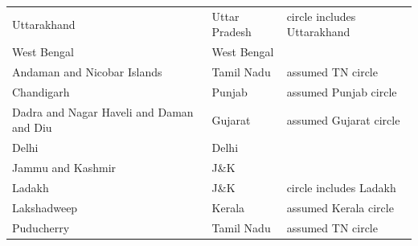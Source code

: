 \documentclass[runningheads]{llncs}
\begin{document}
\begin{longtable}{@{}P{.29\textwidth}P{.25\textwidth}P{.38\textwidth}@{}}
Uttarakhand & Uttar Pradesh & circle includes Uttarakhand \\
West Bengal & West Bengal &  \\
Andaman and Nicobar Islands & Tamil Nadu & assumed TN circle \\
Chandigarh & Punjab & assumed Punjab circle \\
Dadra and Nagar Haveli and Daman and Diu & Gujarat & assumed Gujarat circle \\
Delhi & Delhi &  \\
Jammu and Kashmir & J\&K &  \\
Ladakh & J\&K & circle includes Ladakh \\
Lakshadweep & Kerala & assumed Kerala circle \\
Puducherry & Tamil Nadu & assumed TN circle \\
\end{longtable}
\normalsize
\end{document}
